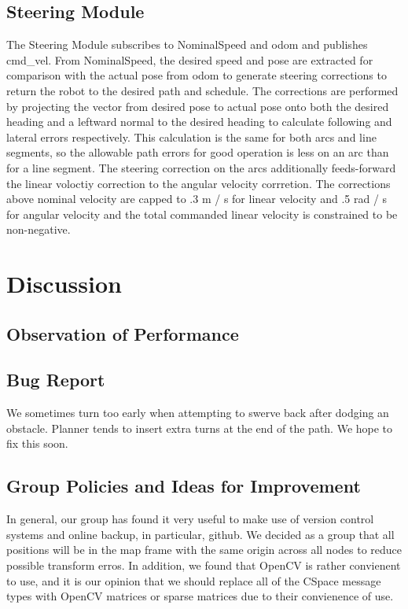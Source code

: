 \documentclass{article}
\begin{document}
\subsection{Steering Module}

The Steering Module subscribes to NominalSpeed and odom and publishes cmd_vel.
From NominalSpeed, the desired speed and pose are extracted for comparison with the actual pose from odom to generate steering corrections to return the robot to the desired path and schedule.
The corrections are performed by projecting the vector from desired pose to actual pose onto both the desired heading and a leftward normal to the desired heading to calculate following and lateral errors respectively.
This calculation is the same for both arcs and line segments, so the allowable path errors for good operation is less on an arc than for a line segment.
The steering correction on the arcs additionally feeds-forward the linear voloctiy correction to the angular velocity corrretion.
The corrections above nominal velocity are capped to .3 m / s for linear velocity and .5 rad / s for angular velocity and the total commanded linear velocity is constrained to be non-negative.

\section{Discussion}
\subsection{Observation of Performance}



\subsection{Bug Report}

We sometimes turn too early when attempting to swerve back after dodging an obstacle.
Planner tends to insert extra turns at the end of the path. We hope to fix this soon.

\subsection{Group Policies and Ideas for Improvement}

In general, our group has found it very useful to make use of version control systems and online backup, in particular, github.
We decided as a group that all positions will be in the map frame with the same origin across all nodes to reduce possible transform erros.
In addition, we found that OpenCV is rather convienent to use, and it is our opinion that we should replace all of the CSpace message types with OpenCV matrices or sparse matrices due to their convienence of use.
\end{document}
